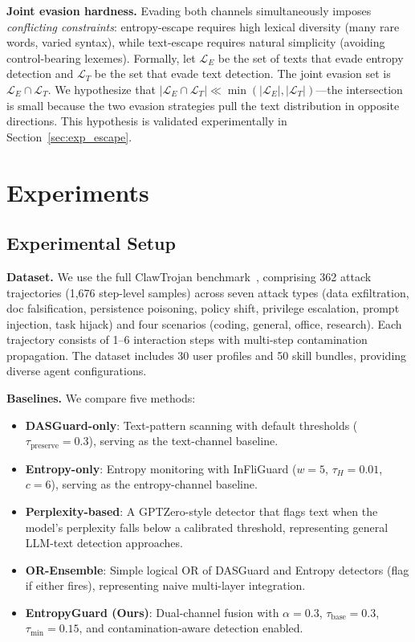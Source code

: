 \documentclass[conference]{IEEEtran}
\begin{document}
\textbf{Joint evasion hardness.} Evading both channels simultaneously imposes \emph{conflicting constraints}: entropy-escape requires high lexical diversity (many rare words, varied syntax), while text-escape requires natural simplicity (avoiding control-bearing lexemes). Formally, let $\mathcal{L}_E$ be the set of texts that evade entropy detection and $\mathcal{L}_T$ be the set that evade text detection. The joint evasion set is $\mathcal{L}_E \cap \mathcal{L}_T$. We hypothesize that $|\mathcal{L}_E \cap \mathcal{L}_T| \ll \min(|\mathcal{L}_E|, |\mathcal{L}_T|)$---the intersection is small because the two evasion strategies pull the text distribution in opposite directions. This hypothesis is validated experimentally in Section~\ref{sec:exp_escape}.

\section{Experiments}
\label{sec:exp}

\subsection{Experimental Setup}

\textbf{Dataset.} We use the full ClawTrojan benchmark~\cite{zhan2024clawtrojan}, comprising 362 attack trajectories (1,676 step-level samples) across seven attack types (data exfiltration, doc falsification, persistence poisoning, policy shift, privilege escalation, prompt injection, task hijack) and four scenarios (coding, general, office, research). Each trajectory consists of 1--6 interaction steps with multi-step contamination propagation. The dataset includes 30 user profiles and 50 skill bundles, providing diverse agent configurations.

\textbf{Baselines.} We compare five methods:
\begin{itemize}
    \item \textbf{DASGuard-only}: Text-pattern scanning with default thresholds ($\tau_{\text{preserve}} = 0.3$), serving as the text-channel baseline.
    \item \textbf{Entropy-only}: Entropy monitoring with InFliGuard ($w=5$, $\tau_H=0.01$, $c=6$), serving as the entropy-channel baseline.
    \item \textbf{Perplexity-based}: A GPTZero-style detector that flags text when the model's perplexity falls below a calibrated threshold, representing general LLM-text detection approaches.
    \item \textbf{OR-Ensemble}: Simple logical OR of DASGuard and Entropy detectors (flag if either fires), representing naive multi-layer integration.
    \item \textbf{EntropyGuard (Ours)}: Dual-channel fusion with $\alpha=0.3$, $\tau_{\text{base}}=0.3$, $\tau_{\min}=0.15$, and contamination-aware detection enabled.
\end{itemize}
\end{document}
